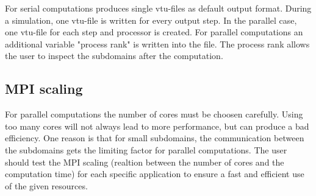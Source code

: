 For serial computations \Dumux produces single vtu-files as default output format. 
During a simulation, one vtu-file is written for every output step. 
In the parallel case, one vtu-file for each step and processor is created. 
For parallel computations an additional variable "process rank" is written 
into the file. The process rank allows the user to inspect the subdomains 
after the computation.

\subsection{MPI scaling}
For parallel computations the number of cores must be choosen 
carefully. Using too many cores will not always lead to more performance, but 
can produce a bad efficiency. One reason is that for small subdomains, the 
communication between the subdomains gets the limiting factor for parallel computations. 
The user should test the MPI scaling (realtion between the number of cores and the computation time) 
for each specific application to ensure a fast and efficient use of the given resources.   
